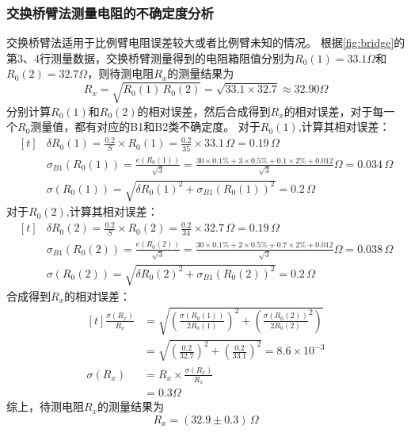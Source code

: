 \documentclass[12pt]{article}
\begin{document}
\subsubsection{交换桥臂法测量电阻的不确定度分析}
\quad 交换桥臂法适用于比例臂电阻误差较大或者比例臂未知的情况。
根据\ref{fig:bridge}的第3、4行测量数据，交换桥臂测量得到的电阻箱阻值分别为$R_0(1)=33.1\Omega$和$R_0(2)=32.7\Omega$，则待测电阻$R_x$的测量结果为
\begin{equation*}
    R_x = \sqrt{R_0(1)\,R_0(2)} = \sqrt{33.1\times32.7} \approx 32.90 \Omega
\end{equation*}
\quad 分别计算$R_0(1)$和$R_0(2)$的相对误差，然后合成得到$R_x$的相对误差，对于每一个$R_0$测量值，都有对应的B1和B2类不确定度。
\quad 对于$R_0(1)$,计算其相对误差：
    \begin{equation*}
    \begin{aligned}[t]
    &\delta R_0(1) = \frac{0.2}{S}\times R_0(1) = \frac{0.2}{35}\times33.1\,\Omega = 0.19\,\Omega \\
    &\sigma_{B1}(R_0(1)) = \frac{e(R_0(1))}{\sqrt{3}} = \frac{30\times0.1\%+3\times0.5\%+0.1\times2\%+0.012}{\sqrt{3}}\Omega = 0.034\,\Omega \\
    &\sigma(R_0(1)) = \sqrt{\delta R_0(1)^2+\sigma_{B1}(R_0(1))^2}=0.2\,\Omega 
    \end{aligned}
    \end{equation*}
\quad 对于$R_0(2)$,计算其相对误差：
    \begin{equation*}
    \begin{aligned}[t]
    &\delta R_0(2) = \frac{0.2}{S}\times R_0(2) = \frac{0.2}{34}\times32.7\,\Omega = 0.19\,\Omega \\
    &\sigma_{B1}(R_0(2)) = \frac{e(R_0(2))}{\sqrt{3}} = \frac{30\times0.1\%+2\times0.5\%+0.7\times2\%+0.012}{\sqrt{3}}\Omega = 0.038\,\Omega \\
    &\sigma(R_0(2)) = \sqrt{\delta R_0(2)^2+\sigma_{B1}(R_0(2))^2}=0.2\,\Omega 
    \end{aligned}
    \end{equation*}
\quad 合成得到$R_x$的相对误差：
    \begin{equation*}
    \begin{aligned}[t]
    \frac{\sigma(R_x)}{R_x} &= \sqrt{(\frac{\sigma(R_0(1))}{2R_0(1)})^2+(\frac{\sigma(R_0(2))}{2R_0(2)}^2)} \\
    &= \sqrt{(\frac{0.2}{32.7})^2+(\frac{0.2}{33.1})^2} = 8.6\times10^{-3}\\
    \sigma(R_x) &= R_x\times\frac{\sigma(R_x)}{R_x} \\
    &= 0.3\Omega
    \end{aligned}
    \end{equation*}
\quad 综上，待测电阻$R_x$的测量结果为
\begin{equation}
    R_x = (32.9\pm0.3)\,\Omega
\end{equation}
\end{document}
